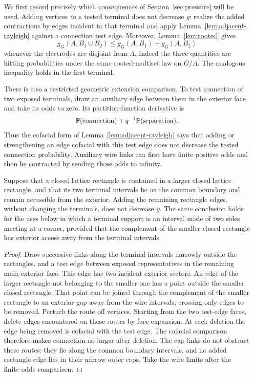 We first record precisely which consequences of Section~\ref{sec:pressure}
will be used.  Adding vertices to a tested terminal does not decrease $g$:
realize the added contractions by edges incident to that terminal and
apply Lemma~\ref{lem:adjacent-rayleigh} against a connection test edge.
Moreover, Lemma~\ref{lem:rooted} gives
\begin{equation}
 g_G(A,B_1\cup B_2)\le g_G(A,B_1)+g_G(A,B_2)
 \label{rect:subadditivity}
\end{equation}
whenever the electrodes are disjoint from $A$.  Indeed the three
quantities are hitting probabilities under the same rooted-multiset law
on $G/A$.  The analogous inequality holds in the first terminal.

There is also a restricted geometric extension comparison.  To test
connection of two exposed terminals, draw an auxiliary edge between them
in the exterior face and take its odds to zero.  Its partition-function
derivative is
\[
 \mathbb P(\text{connection})+q^{-1}\mathbb P(\text{separation}).
\]
Thus the cofacial form of Lemma~\ref{lem:adjacent-rayleigh} says that
adding or strengthening an edge cofacial with this test edge does not decrease
the tested connection probability.  Auxiliary wire links can first have
finite positive odds and then be contracted by sending those odds to
infinity.

\begin{lemma}
\label{rect:extension}
Suppose that a closed lattice rectangle is contained in a larger closed
lattice rectangle, and that its two terminal intervals lie on the common
boundary and remain accessible from the exterior.  Adding the remaining
rectangle edges, without changing the terminals, does not decrease $g$.
The same conclusion holds for the uses below in which a terminal support
is an interval made of two sides meeting at a corner, provided that the
complement of the smaller closed rectangle has exterior access away from
the terminal intervals.
\end{lemma}

\begin{proof}
Draw successive links along the terminal intervals narrowly outside the
rectangles, and a test edge between exposed representatives in the
remaining main exterior face.  This edge has two incident exterior
sectors.  An edge of the larger rectangle not belonging to the smaller
one has a point outside the smaller closed rectangle.  That point can be
joined through the complement of the smaller rectangle to an exterior
gap away from the wire intervals, crossing only edges to be removed.
Perturb the route off vertices.  Starting from the two test-edge faces,
delete edges encountered on these routes by face expansion.  At each
deletion the edge being removed is cofacial with the test edge.  The
cofacial comparison therefore makes connection no larger after deletion.
The cap links do not obstruct these routes: they lie along the common
boundary intervals, and no added rectangle edge lies in their narrow
outer caps.  Take the wire limits after the finite-odds comparison.
\end{proof}

